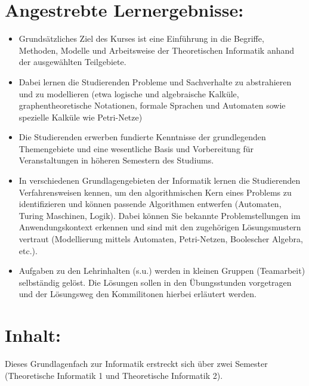 \section{Angestrebte
Lernergebnisse:}\label{angestrebte-lernergebnisse-27}

\begin{itemize}
\item
  Grundsätzliches Ziel des Kurses ist eine Einführung in die Begriffe,
  Methoden, Modelle und Arbeitsweise der Theoretischen Informatik anhand
  der ausgewählten Teilgebiete.
\item
  Dabei lernen die Studierenden Probleme und Sachverhalte zu
  abstrahieren und zu modellieren (etwa logische und algebraische
  Kalküle, graphentheoretische Notationen, formale Sprachen und
  Automaten sowie spezielle Kalküle wie Petri-Netze)
\item
  Die Studierenden erwerben fundierte Kenntnisse der grundlegenden
  Themengebiete und eine wesentliche Basis und Vorbereitung für
  Veranstaltungen in höheren Semestern des Studiums.
\item
  In verschiedenen Grundlagengebieten der Informatik lernen die
  Studierenden Verfahrensweisen kennen, um den algorithmischen Kern
  eines Problems zu identifizieren und können passende Algorithmen
  entwerfen (Automaten, Turing Maschinen, Logik). Dabei können Sie
  bekannte Problemstellungen im Anwendungskontext erkennen und sind mit
  den zugehörigen Lösungsmustern vertraut (Modellierung mittels
  Automaten, Petri-Netzen, Boolescher Algebra, etc.).
\item
  Aufgaben zu den Lehrinhalten (s.u.) werden in kleinen Gruppen
  (Teamarbeit) selbständig gelöst. Die Lösungen sollen in den
  Übungsstunden vorgetragen und der Lösungsweg den Kommilitonen hierbei
  erläutert werden.
\end{itemize}

\section{Inhalt:}\label{inhalt-27}

Dieses Grundlagenfach zur Informatik erstreckt sich über zwei Semester
(Theoretische Informatik 1 und Theoretische Informatik 2).


